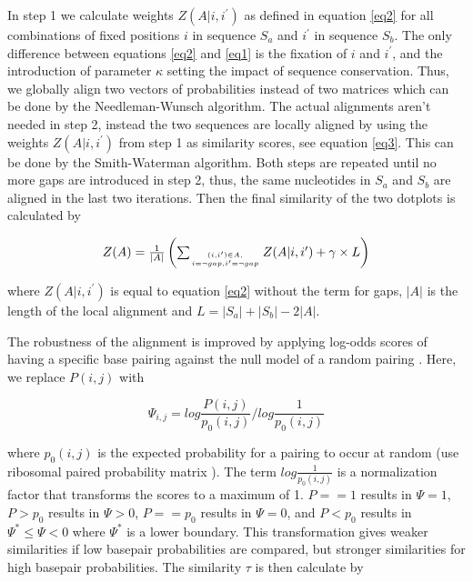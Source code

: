 \documentclass[a4paper,twoside]{article}
\begin{document}
In step 1 we calculate weights $Z(A|i,i^\prime)$ as defined in equation
\ref{eq2} for all combinations of fixed positions $i$ in sequence $S_a$ and
$i^\prime$ in sequence $S_b$.  The only difference between equations \ref{eq2}
and \ref{eq1} is the fixation of $i$ and $i^\prime$, and the introduction of
parameter $\kappa$ setting the impact of sequence conservation. Thus, we
globally align two vectors of probabilities instead of two matrices which can
be done by the Needleman-Wunsch algorithm. The actual alignments aren't needed
in step 2, instead the two sequences are locally aligned by using the weights
$Z(A|i,i^\prime)$ from step 1 as similarity scores, see equation \ref{eq3}. This
can be done by the Smith-Waterman algorithm.  Both steps are repeated until no
more gaps are introduced in step 2, thus, the same nucleotides in $S_a$ and
$S_b$ are aligned in the last two iterations.  Then the final similarity of
the two dotplots is calculated by

\begin{equation}\label{eq4}
\arraycolsep=1.4pt
\begin{array}{rl}
Z(A) = & \frac{1}{|A|} \left( \sum_{(i,i^\prime) \in A,\atop {i=\neg gap, i^\prime=\neg gap}} Z(A|i,i^\prime) + \gamma \times L \right)
\end{array}
\end{equation}

where $Z(A|i,i^\prime)$ is equal to equation \ref{eq2} without the term for
gaps, $|A|$ is the length of the local alignment and $L = |S_a|+|S_b|-2|A|$.

The robustness of the alignment is improved by applying log-odds scores of
having a specific base pairing against the null model of a random pairing
\cite{Will17432929}.  Here, we replace $P(i,j)$ with 

\begin{equation}
	\Psi_{i,j} = log \frac{P(i,j)}{p_0(i,j)} / log \frac{1}{p_0(i,j)} 
\end{equation}

where $p_0(i,j)$ is the expected probability for a pairing to occur at random
(use ribosomal paired probability matrix
\cite{Knudsen:Hein:RNA_secon_struc:1999}). The term $log \frac{1}{p_0(i,j)}$ is
a normalization factor that transforms the scores to a maximum of 1. $P==1$
results in $\Psi=1$, $P>p_0$ results in $\Psi>0$, $P==p_0$ results in $\Psi=0$,
and $P<p_0$ results in $\Psi^*\le\Psi<0$ where $\Psi^*$ is a lower boundary.
This transformation gives weaker similarities if low basepair probabilities are
compared, but stronger similarities for high basepair probabilities. The
similarity $\tau$ is then calculate by
\end{document}

